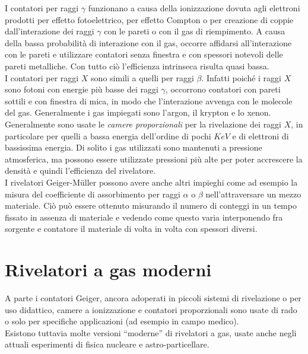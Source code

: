 \documentclass[12pt, letterpaper]{book}
\begin{document}
I contatori per raggi $\gamma$ funzionano a causa della ionizzazione dovuta agli elettroni prodotti per effetto fotoelettrico, per effetto Compton o per creazione di coppie dall'interazione dei raggi $\gamma$ con le pareti o con il gas di riempimento. A causa della bassa probabilità di interazione con il gas, occorre affidarsi all'interazione con le pareti e utilizzare contatori senza finestra e con spessori notevoli delle pareti metalliche. Con tutto ciò l'efficienza intrinseca risulta quasi bassa.\\
I contatori per raggi $X$ sono simili a quelli per raggi $\beta$. Infatti poiché i raggi $X$ sono fotoni con energie più basse dei raggi $\gamma$, occorrono contatori con pareti sottili e con finestra di mica, in modo che l'interazione avvenga con le molecole del gas. Generalmente i gas impiegati sono l'argon, il krypton e lo xenon. Generalmente sono usate le \textit{camere proporzionali} per la rivelazione dei raggi $X$, in particolare per quelli a bassa energia dell'ordine di pochi $KeV$ e di elettroni di bassissima energia. Di solito i gas utilizzati sono mantenuti
a pressione atmosferica, ma possono essere utilizzate pressioni più alte per poter accrescere la densità e quindi l'efficienza del rivelatore.\\
I rivelatori Geiger-Müller possono avere anche altri impieghi come ad esempio la misura del coefficiente di assorbimento per raggi $\alpha$ o $\beta$ nell'attraversare un mezzo materiale. Ciò può essere ottenuto misurando il numero di conteggi in un tempo fissato in assenza di materiale e vedendo come questo varia interponendo fra sorgente e contatore il materiale di volta in volta con spessori diversi.

\section{Rivelatori a gas moderni}
A parte i contatori Geiger, ancora adoperati in piccoli sistemi di rivelazione o per uso didattico, camere a ionizzazione e contatori proporzionali sono usate di rado o solo per specifiche applicazioni (ad esempio in campo medico).\\
Esistono tuttavia molte versioni “moderne” di rivelatori a gas, usate anche negli attuali esperimenti di fisica nucleare e astro-particellare.
\end{document}

